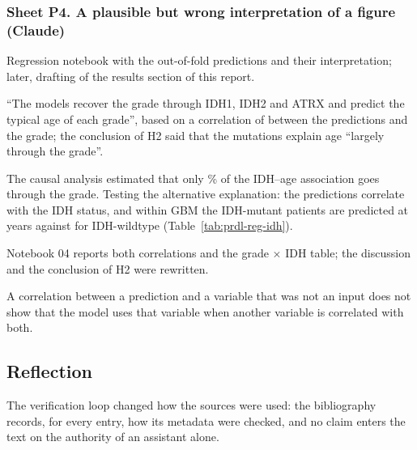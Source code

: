 \subsubsection*{Sheet P4. A plausible but wrong interpretation of a figure (Claude)}
\begin{description}[style=nextline, leftmargin=1.2em]
  \item[Prompt] Regression notebook with the out-of-fold predictions and their interpretation; later,
        drafting of the results section of this report.
  \item[Faulty response] ``The models recover the grade through IDH1, IDH2 and ATRX and predict the
        typical age of each grade'', based on a correlation of \RegCorrGrade{} between the predictions
        and the grade; the conclusion of H2 said that the mutations explain age ``largely through the
        grade''.
  \item[Proof] The causal analysis estimated that only \CsPropPct\% of the
        IDH--age association goes through the grade. Testing the alternative explanation:
        the predictions correlate \RegCorrIDH{} with the IDH status, and within GBM the IDH-mutant
        patients are predicted at \RegPredGBMIDHmut{} years against \RegPredGBMIDHwt{} for IDH-wildtype
        (Table~\ref{tab:prdl-reg-idh}).
  \item[Correction] Notebook 04 reports both correlations and the grade $\times$ IDH table; the
        discussion and the conclusion of H2 were rewritten.
  \item[Reproduction] 
  \item[Reflection] A correlation between a prediction and a variable that was not an input does not
        show that the model uses that variable when another variable is correlated with both.
\end{description}

\subsection*{Reflection}

The verification loop changed how the sources were used: the bibliography records, for every entry,
how its metadata were checked, and no claim enters the text on the authority of an assistant alone.

